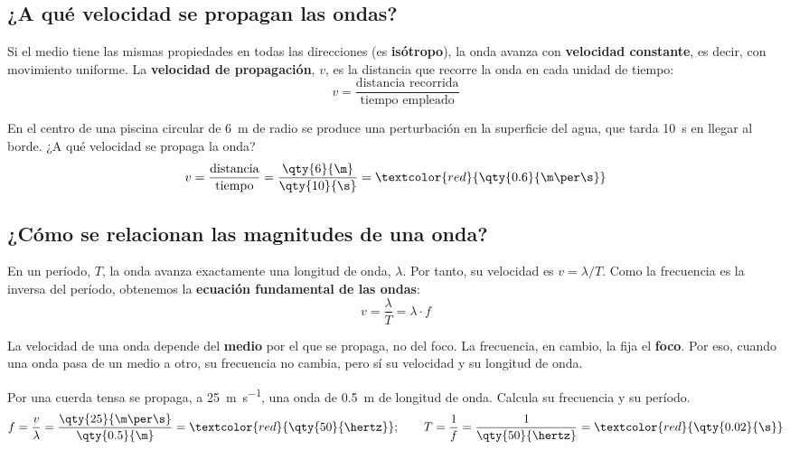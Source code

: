 \subsection{¿A qué velocidad se propagan las ondas?}

Si el medio tiene las mismas propiedades en todas las direcciones (es \textbf{isótropo}), la onda avanza con \textbf{velocidad constante}, es decir, con movimiento uniforme. La \textbf{velocidad de propagación}, \(v\), es la distancia que recorre la onda en cada unidad de tiempo:
\[ v = \frac{\text{distancia recorrida}}{\text{tiempo empleado}} \]

\begin{example}
    En el centro de una piscina circular de \qty{6}{\m} de radio se produce una perturbación en la superficie del agua, que tarda \qty{10}{\s} en llegar al borde. ¿A qué velocidad se propaga la onda?
    \[ v = \frac{\text{distancia}}{\text{tiempo}} = \frac{\qty{6}{\m}}{\qty{10}{\s}} = \textcolor{red}{\qty{0.6}{\m\per\s}} \]
\end{example}

\subsection{¿Cómo se relacionan las magnitudes de una onda?}

En un período, \(T\), la onda avanza exactamente una longitud de onda, \(\lambda\). Por tanto, su velocidad es \(v = \lambda / T\). Como la frecuencia es la inversa del período, obtenemos la \textbf{ecuación fundamental de las ondas}:
\begin{equation*}
    \boxed{v = \frac{\lambda}{T} = \lambda \cdot f}
\end{equation*}

\begin{remark}
    La velocidad de una onda depende del \textbf{medio} por el que se propaga, no del foco. La frecuencia, en cambio, la fija el \textbf{foco}. Por eso, cuando una onda pasa de un medio a otro, su frecuencia no cambia, pero sí su velocidad y su longitud de onda.
\end{remark}

\begin{example}
    Por una cuerda tensa se propaga, a \qty{25}{\m\per\s}, una onda de \qty{0.5}{\m} de longitud de onda. Calcula su frecuencia y su período.
    \[ f = \frac{v}{\lambda} = \frac{\qty{25}{\m\per\s}}{\qty{0.5}{\m}} = \textcolor{red}{\qty{50}{\hertz}}; \qquad T = \frac{1}{f} = \frac{1}{\qty{50}{\hertz}} = \textcolor{red}{\qty{0.02}{\s}} \]
\end{example}

